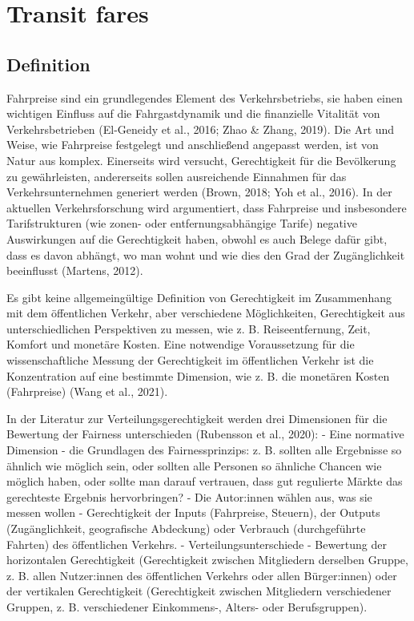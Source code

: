 \documentclass[
]{book}
\begin{document}
\hypertarget{dist_time_fares}{%
\section{Transit fares}\label{dist_time_fares}}

\hypertarget{definition-23}{%
\subsection*{Definition}\label{definition-23}}

Fahrpreise sind ein grundlegendes Element des Verkehrsbetriebs, sie haben einen wichtigen Einfluss auf die Fahrgastdynamik und die finanzielle Vitalität von Verkehrsbetrieben (El-Geneidy et al., 2016; Zhao \& Zhang, 2019). Die Art und Weise, wie Fahrpreise festgelegt und anschließend angepasst werden, ist von Natur aus komplex. Einerseits wird versucht, Gerechtigkeit für die Bevölkerung zu gewährleisten, andererseits sollen ausreichende Einnahmen für das Verkehrsunternehmen generiert werden (Brown, 2018; Yoh et al., 2016). In der aktuellen Verkehrsforschung wird argumentiert, dass Fahrpreise und insbesondere Tarifstrukturen (wie zonen- oder entfernungsabhängige Tarife) negative Auswirkungen auf die Gerechtigkeit haben, obwohl es auch Belege dafür gibt, dass es davon abhängt, wo man wohnt und wie dies den Grad der Zugänglichkeit beeinflusst (Martens, 2012).

Es gibt keine allgemeingültige Definition von Gerechtigkeit im Zusammenhang mit dem öffentlichen Verkehr, aber verschiedene Möglichkeiten, Gerechtigkeit aus unterschiedlichen Perspektiven zu messen, wie z. B. Reiseentfernung, Zeit, Komfort und monetäre Kosten. Eine notwendige Voraussetzung für die wissenschaftliche Messung der Gerechtigkeit im öffentlichen Verkehr ist die Konzentration auf eine bestimmte Dimension, wie z. B. die monetären Kosten (Fahrpreise) (Wang et al., 2021).

In der Literatur zur Verteilungsgerechtigkeit werden drei Dimensionen für die Bewertung der Fairness unterschieden (Rubensson et al., 2020):
- Eine normative Dimension - die Grundlagen des Fairnessprinzips: z. B. sollten alle Ergebnisse so ähnlich wie möglich sein, oder sollten alle Personen so ähnliche Chancen wie möglich haben, oder sollte man darauf vertrauen, dass gut regulierte Märkte das gerechteste Ergebnis hervorbringen?
- Die Autor:innen wählen aus, was sie messen wollen - Gerechtigkeit der Inputs (Fahrpreise, Steuern), der Outputs (Zugänglichkeit, geografische Abdeckung) oder Verbrauch (durchgeführte Fahrten) des öffentlichen Verkehrs.
- Verteilungsunterschiede - Bewertung der horizontalen Gerechtigkeit (Gerechtigkeit zwischen Mitgliedern derselben Gruppe, z. B. allen Nutzer:innen des öffentlichen Verkehrs oder allen Bürger:innen) oder der vertikalen Gerechtigkeit (Gerechtigkeit zwischen Mitgliedern verschiedener Gruppen, z. B. verschiedener Einkommens-, Alters- oder Berufsgruppen).
\end{document}
